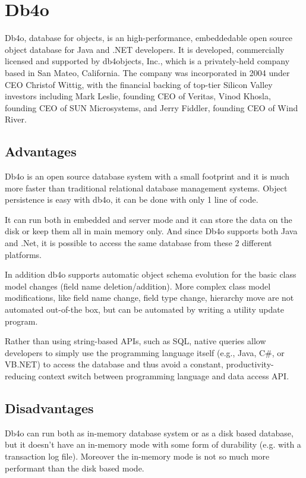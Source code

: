 		\section{Db4o}
Db4o, database for objects, is an high-performance, embeddedable open source object database for Java and .NET developers. It is developed, commercially licensed and supported by db4objects, Inc., which is a privately-held company based in San Mateo, California. The company was incorporated in 2004 under CEO Christof Wittig, with the financial backing of top-tier Silicon Valley investors including Mark Leslie, founding CEO of Veritas, Vinod Khosla, founding CEO of SUN Microsystems, and Jerry Fiddler, founding CEO of Wind River.

 

		
			\subsection{Advantages}
Db4o is an open source database system with a small footprint and it is much more faster than traditional relational database management systems. Object persistence is easy with db4o, it can be done with only 1 line of code. 

It can run both in embedded and server mode and it can store the data on the disk or keep them all in main memory only. And since Db4o supports both Java and .Net, it is possible to access the same database from these 2 different platforms. 

In addition db4o supports automatic object schema evolution for the basic class model changes (field name deletion/addition). More complex class model modifications, like field name change, field type change, hierarchy move are not automated out-of-the box, but can be automated by writing a utility update program.

Rather than using string-based APIs, such as SQL, native queries allow developers to simply use the programming language itself (e.g., Java, C\#, or VB.NET) to access the database and thus avoid a constant, productivity-reducing context switch between programming language and data access API.
		
			\subsection{Disadvantages}
Db4o can run both as in-memory database system or as a disk based database, but it doesn't have an in-memory mode with some form of durability (e.g. with a transaction log file). Moreover the in-memory mode is not so much more performant than the disk based mode. 

